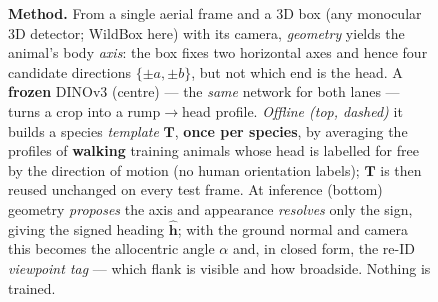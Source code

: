 \begin{figure}[t]
\begin{tikzpicture}
\end{tikzpicture}
\caption{\textbf{Method.} From a single aerial frame and a 3D box (any monocular 3D detector; WildBox
here) with its camera, \emph{geometry} yields the animal's body \emph{axis}: the box fixes two
horizontal axes and hence four candidate directions $\{\pm a,\pm b\}$, but not which end is the head.
A \textbf{frozen} DINOv3 (centre) --- the \emph{same} network for both lanes --- turns a crop into a
rump$\to$head profile. \emph{Offline (top, dashed)} it builds a species \emph{template} $\mathbf{T}$,
\textbf{once per species}, by averaging the profiles of \textbf{walking} training animals whose head is
labelled for free by the direction of motion (no human orientation labels); $\mathbf{T}$ is then reused
unchanged on every test frame. At inference (bottom) geometry \emph{proposes} the axis and appearance
\emph{resolves} only the sign, giving the signed heading $\hat{\mathbf h}$; with the ground normal and
camera this becomes the allocentric angle $\alpha$ and, in closed form, the re-ID \emph{viewpoint tag}
--- which flank is visible and how broadside. Nothing is trained.}
\label{fig:method}
\end{figure}
